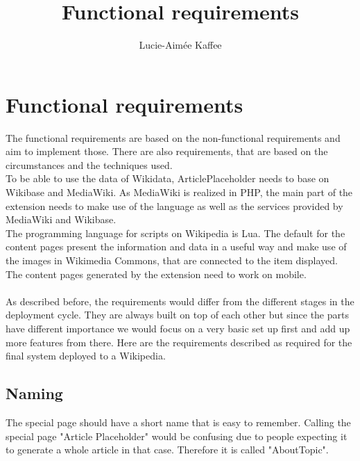 \documentclass[11pt]{article}
\title {{Functional requirements}}
\author {Lucie-Aim\'{e}e Kaffee}
\date{}
\begin{document}
\listoftodos

\section {Functional requirements}
The functional requirements are based on the non-functional requirements and aim to implement those.
There are also requirements, that are based on the circumstances and the techniques used. \\
To be able to use the data of Wikidata, ArticlePlaceholder needs to base on Wikibase and MediaWiki.
As MediaWiki is realized in PHP, the main part of the extension needs to make use of the language as well as the services provided by MediaWiki and Wikibase. \\
The programming language for scripts on Wikipedia is Lua. %
The default for the content pages present the information and data in a useful way and make use of the images in Wikimedia Commons, that are connected to the item displayed.\\
The content pages generated by the extension need to work on mobile. \\
\\
As described before, the requirements would differ from the different stages in the deployment cycle. They are always built on top of each other but since the parts have different importance we would focus on a very basic set up first and add up more features from there. Here are the requirements described as required for the final system deployed to a Wikipedia. \\

\subsection{Naming}
The special page should have a short name that is easy to remember. Calling the special page "Article Placeholder" would be confusing due to people expecting it to generate a whole article in that case. Therefore it is called "AboutTopic". %
\end{document}
